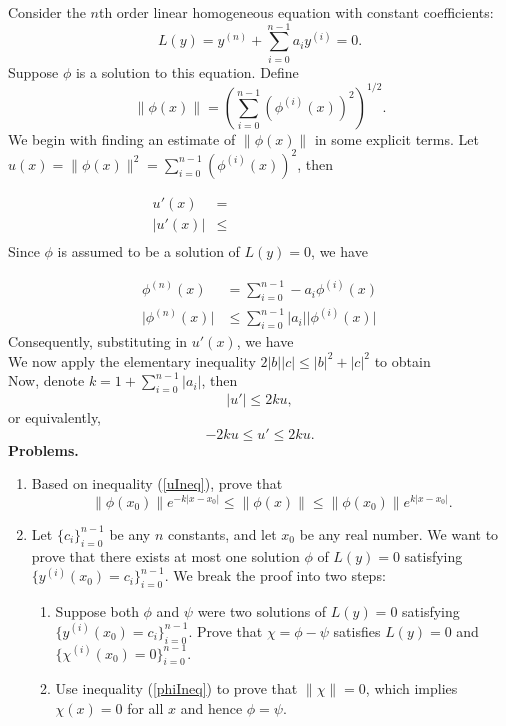 \documentclass[10pt]{article}
\title{}
\date{}
\newcommand{\norm}[1]{\lVert #1 \rVert}
\newcommand{\abs}[1]{\lvert #1 \rvert}
\begin{document}
Consider the $n$th order linear homogeneous equation with constant coefficients:
\[
	L(y) =y^{(n)} +  \sum_{i = 0}^{n - 1}a_iy^{(i)} = 0.
\]
Suppose $\phi$ is a solution to this equation. Define
\[
\norm{\phi(x)} = \left(\sum_{i = 0}^{n - 1} {\left(\phi^{(i)}(x)\right)^2}\right)^{1/2}.
\]
We begin with finding an estimate of $\norm{\phi(x)}$ in some explicit terms. Let $u(x) = \norm{\phi(x)}^2 = \sum_{i = 0}^{n - 1} {\left(\phi^{(i)}(x)\right)^2}$, then

\begin{align*}
u'(x) &=\hspace{10em} \\[2em]
\abs{u'(x)}& \leq\\
\end{align*}
Since $\phi$ is assumed to be a solution of $L(y) = 0$, we have

\begin{align*}
	\phi^{(n)}(x) &= \sum_{i = 0}^{n - 1} -a_i\phi^{(i)}(x)\\
	\abs{\phi^{(n)}(x)} &\leq  \sum_{i = 0}^{n - 1} \abs{a_i}\abs{\phi^{(i)}(x)}
\end{align*}
Consequently, substituting in $u'(x)$, we have
\\
We now apply the elementary inequality $2\abs{b}\abs{c} \leq \abs{b}^2 + \abs{c}^2$
to obtain
\\
Now, denote $k =1 + \sum_{i = 0}^{n - 1}\abs{a_i}$, then 
\[
\abs{u'} \leq 2ku,
\]
or equivalently, 
\begin{equation}
\label{uIneq}
-2ku \leq {u'} \leq 2ku.
\end{equation}
\clearpage
\noindent
{\bf Problems.}
\begin{enumerate}
\item
Based on inequality (\ref{uIneq}), prove that
\begin{equation}
\label{phiIneq}
	\norm{\phi(x_0)}e^{-k\abs{x - x_0}} \leq \norm{\phi(x)}\leq \norm{\phi(x_0)}e^{k\abs{x - x_0}}.
\end{equation}
\item Let $\{c_i\}_{i=0}^{n-1}$ be any $n$ constants, and let $x_0$ be any real number. We want to prove that there exists at most one solution $\phi$  of $L(y) = 0$ satisfying $\{y^{(i)}(x_0) = c_i\}_{i=0}^{n-1}$. We break the proof into two steps:
\begin{enumerate}
\item
  Suppose both $\phi$ and $\psi$ were two solutions of $L(y) = 0$ satisfying $\{y^{(i)}(x_0) = c_i\}_{i=0}^{n-1}$. Prove that $\chi = \phi - \psi$ satisfies $L(y) = 0$ and $\{\chi^{(i)}(x_0) = 0\}_{i=0}^{n-1}$.
\item Use inequality (\ref{phiIneq}) to prove that $\norm{\chi} = 0$, which implies $\chi(x) = 0$ for all $x$ and hence $\phi = \psi$.
\end{enumerate}

\end{enumerate}
\end{document}
